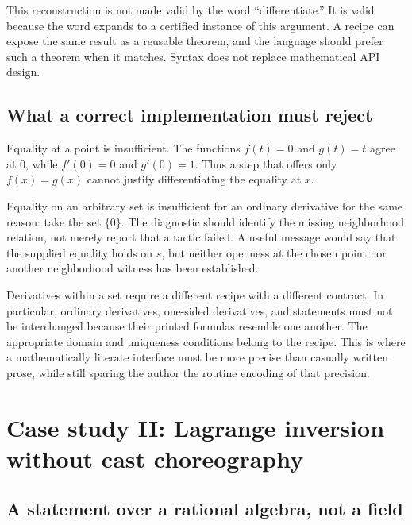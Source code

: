 \documentclass[11pt,letterpaper]{article}
\newcommand{\code}[1]{\texttt{\detokenize{#1}}}
\theoremstyle{remark}
\begin{document}
This reconstruction is not made valid by the word ``differentiate.'' It is valid because the word expands to a certified instance of this argument. A recipe can expose the same result as a reusable theorem, and the language should prefer such a theorem when it matches. Syntax does not replace mathematical API design.

\subsection{What a correct implementation must reject}

Equality at a point is insufficient. The functions $f(t)=0$ and $g(t)=t$ agree at $0$, while $f'(0)=0$ and $g'(0)=1$. Thus a step that offers only $f(x)=g(x)$ cannot justify differentiating the equality at $x$.

Equality on an arbitrary set is insufficient for an ordinary derivative for the same reason: take the set $\{0\}$. The diagnostic should identify the missing neighborhood relation, not merely report that a tactic failed. A useful message would say that the supplied equality holds on $s$, but neither openness at the chosen point nor another neighborhood witness has been established.

Derivatives within a set require a different recipe with a different contract. In particular, ordinary derivatives, one-sided derivatives, and \code{HasDerivWithinAt} statements must not be interchanged because their printed formulas resemble one another. The appropriate domain and uniqueness conditions belong to the recipe. This is where a mathematically literate interface must be more precise than casually written prose, while still sparing the author the routine encoding of that precision.

\section{Case study II: Lagrange inversion without cast choreography}
\label{sec:abel}

\subsection{A statement over a rational algebra, not a field}
\end{document}

